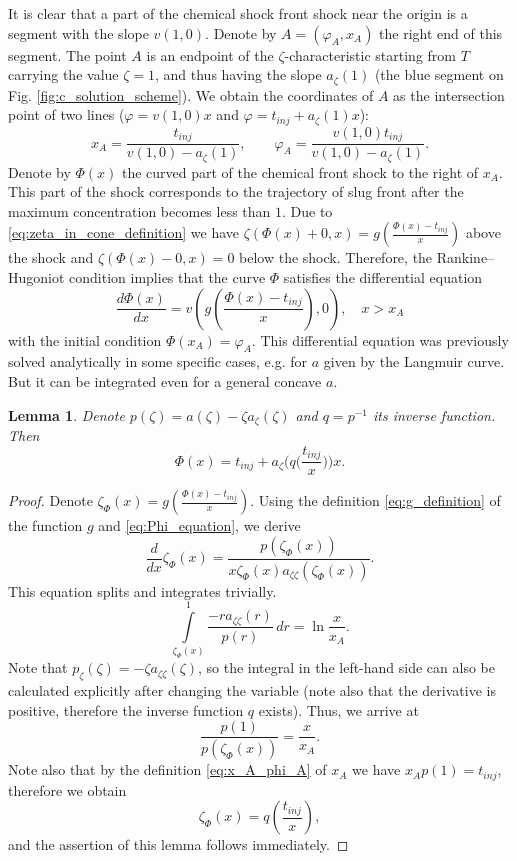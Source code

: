 \documentclass[12pt]{article}
\newtheorem{lemma}{Lemma}
\theoremstyle{definition}
\begin{document}
It is clear that a part of the chemical shock front shock near the origin is a segment with the slope $v(1, 0)$. Denote by $A = (\varphi_A, x_A)$ the right end of this segment.
The point $A$ is an endpoint of the $\zeta$-characteristic starting from $T$ carrying the value $\zeta=1$, and thus having the slope $a_\zeta(1)$ (the blue segment on Fig. \ref{fig:c_solution_scheme}). 
We obtain the coordinates of $A$ as the intersection point of two lines ($\varphi = v(1, 0)x$ and $\varphi = t_{inj} + a_\zeta(1)x$):
\begin{equation}
\label{eq:x_A_phi_A}
x_A = \frac{t_{inj}}{v(1, 0) - a_\zeta(1)},\qquad 
\varphi_A = \frac{v(1, 0)t_{inj}}{v(1, 0)-a_\zeta(1)}.
\end{equation}
Denote by $\Phi(x)$ the curved part of the chemical front shock to the right of $x_A$. This part of the shock corresponds to the trajectory of slug front after the maximum concentration becomes less than $1$. Due to \eqref{eq:zeta_in_cone_definition} we have $\zeta(\Phi(x)+0, x) = g\left(\frac{\Phi(x)-t_{inj}}{x}\right)$ above the shock and $\zeta(\Phi(x)-0, x) = 0$ below the shock. Therefore, the Rankine--Hugoniot condition implies that the curve $\Phi$ satisfies the differential equation 
\begin{equation}
\label{eq:Phi_equation}
\frac{d\Phi(x)}{dx} = v\left(g\left(\frac{\Phi(x)-t_{inj}}x\right), 0\right),\quad x>x_A
\end{equation}
with the initial condition $\Phi(x_A) = \varphi_A$. This differential equation was previously solved analytically in some specific cases, e.g. for $a$ given by the Langmuir curve. But it can be integrated even for a general concave $a$. 

\begin{lemma}
\label{lemma_explicit_Phi}
Denote $p(\zeta) = a(\zeta)-\zeta a_\zeta(\zeta)$ and $q = p^{-1}$ its inverse function. Then
\[
\Phi(x) = t_{inj} + a_\zeta\Big(q\Big(\dfrac{t_{inj}}{x}\Big)\Big) x.
\]
\end{lemma}
\begin{proof}
Denote $\zeta_\Phi(x) = g\left(\frac{\Phi(x)-t_{inj}}x\right)$. Using the definition \eqref{eq:g_definition} of the function $g$ and \eqref{eq:Phi_equation}, we derive
\[
\dfrac{d}{dx}\zeta_\Phi(x) = \dfrac{p(\zeta_\Phi(x))}{x\zeta_\Phi(x)a_{\zeta\zeta}(\zeta_\Phi(x))}.
\]
This equation splits and integrates trivially.
\[
\int\limits_{\zeta_\Phi(x)}^1 \dfrac{-ra_{\zeta\zeta}(r)}{p(r)}\,dr = \ln\dfrac{x}{x_A}.
\]
Note that $p_\zeta(\zeta) = -\zeta a_{\zeta\zeta}(\zeta)$, so the integral in the left-hand side can also be calculated explicitly after changing the variable (note also that the derivative is positive, therefore the inverse function $q$ exists). Thus, we arrive at
\[
\dfrac{p(1)}{p(\zeta_\Phi(x))} = \dfrac{x}{x_A}.
\]
Note also that by the definition \eqref{eq:x_A_phi_A} of $x_A$ we have $x_A p(1) = t_{inj}$, therefore we obtain
\[
\zeta_\Phi(x) = q\left(\dfrac{t_{inj}}{x}\right),
\]
and the assertion of this lemma follows immediately.
\end{proof}
\end{document}

